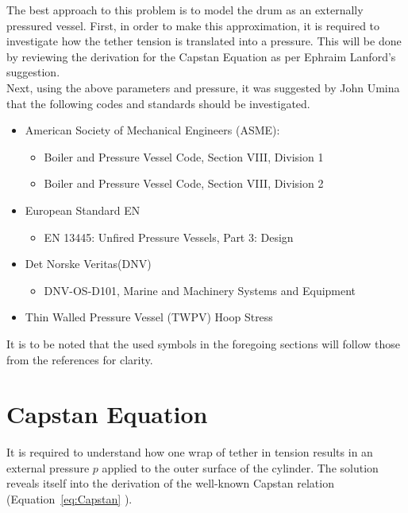 The best approach to this problem is to model the drum as an externally pressured vessel. First, in order to make this approximation, it is required to investigate how the tether tension is translated into a pressure. This will be done by reviewing the derivation for the Capstan Equation as per Ephraim Lanford's suggestion.\\ 

Next, using the above parameters and pressure, it was suggested by John Umina that the following codes and standards should be investigated.
\begin{itemize}
	\item American Society of Mechanical Engineers (ASME):
	      \begin{itemize}[label=$\bullet$]
	      	\item Boiler and Pressure Vessel Code, Section VIII, Division 1\cite{ASMEbvpcVII1}
	      	\item Boiler and Pressure Vessel Code, Section VIII, Division 2\cite{ASMEbvpcVII2}
	      \end{itemize}
	\item European Standard EN
	      \begin{itemize}[label=$\bullet$]
	      	\item EN 13445: Unfired Pressure Vessels, Part 3: Design\cite{EN134453}
	      \end{itemize}
	\item Det Norske Veritas(DNV)
	      \begin{itemize}[label=$\bullet$]
	      	\item DNV-OS-D101, Marine and Machinery Systems and Equipment \cite{DNVOSD101}
	      \end{itemize}
	\item Thin Walled Pressure Vessel (TWPV) Hoop Stress \cite{roarks}\\	
\end{itemize}

It is to be noted that the used symbols in the foregoing sections will follow those from the references for clarity.
\section{Capstan Equation}
It is required to understand how one wrap of tether in tension results in an external pressure $p$ applied to the outer surface of the cylinder. The solution reveals itself into the derivation of the well-known Capstan relation (Equation~\ref{eq:Capstan} \cite{capstanman}).

